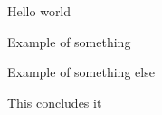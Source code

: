 \documentclass{article}
\begin{document}
\newcommand{\lmmnode}[4][]{}

\lmmnode{}{root}{Start}

\lmmnode{root}{p1}{Introduction}
Hello world

\lmmnode{p1}{ex1}{Example 1}
Example of something

\lmmnode{p1}{ex2}{Example 2}
Example of something else

\lmmnode{root}{p2}{Conclusion}
This concludes it
\end{document}
